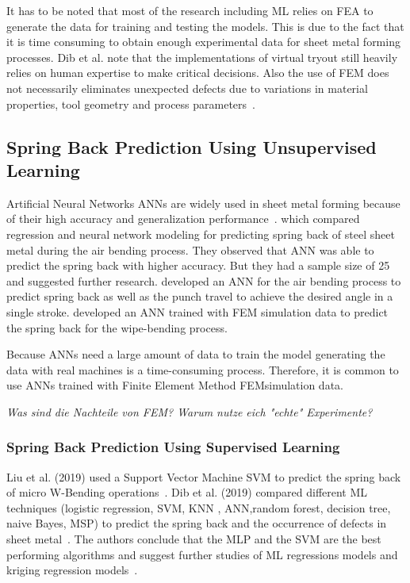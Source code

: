 It has to be noted that most of the research including \ac{ML} relies on FEA to generate the data for training and
testing the models.
This is due to the fact that it is time consuming to obtain enough experimental data for
sheet metal forming processes.
Dib et al. note that the implementations of virtual tryout still heavily relies on human expertise to make critical
decisions.
Also the use of FEM does not necessarily eliminates unexpected defects due to variations
in material properties, tool geometry and process parameters~\cite[p. 2]{dib_singleensembleclassifiers_2020}.

\subsection*{Spring Back Prediction Using Unsupervised Learning}
Artificial Neural Networks \ac{ANN}s are widely used in sheet metal forming because of
their high accuracy and generalization performance~\cite[p. 2]{cruz_applicationmachinelearning_2021}.
\cite[]{narayanasamy_comparisonregressionartificial_2012a} which compared regression
and neural network modeling for predicting spring back of steel sheet metal during the air bending process.
They observed that ANN was able to predict the spring back with higher accuracy. But
they had a sample size of 25 and suggested further research.
\cite[]{inamdar_developmentartificialneural_2000} developed an ANN for the air bending
process to predict spring back as well as the punch travel to achieve the desired angle in a single stroke.
\cite[]{kazan_predictionspringbackwipebending_2009} developed an ANN trained with FEM
simulation data to predict the spring back for the wipe-bending process.

Because \ac{ANN}s need a large amount of data to train the model generating the data
with real
machines is a time-consuming process.
Therefore, it is common to use \ac{ANN}s trained with Finite Element Method \ac{FEM}simulation data.

\textit{Was sind die Nachteile von FEM? Warum nutze eich "echte" Experimente?}
\subsubsection*{Spring Back Prediction Using Supervised Learning}
Liu et al. (2019) used a Support Vector Machine \ac{SVM} to predict the spring back of
micro
W-Bending operations~\cite{liu_springbackpredictionforming_2019}.
Dib et al. (2019) compared different \ac{ML} techniques (logistic regression, SVM, KNN
, ANN,random forest, decision tree, naive Bayes, MSP) to predict the spring back and the occurrence of
defects in sheet metal~\cite[p. 1]{dib_singleensembleclassifiers_2020}.
The authors conclude that the MLP and the SVM are the best performing algorithms and
suggest further studies of ML regressions models and kriging regression
models~\cite[p. 13]{dib_singleensembleclassifiers_2020}.

